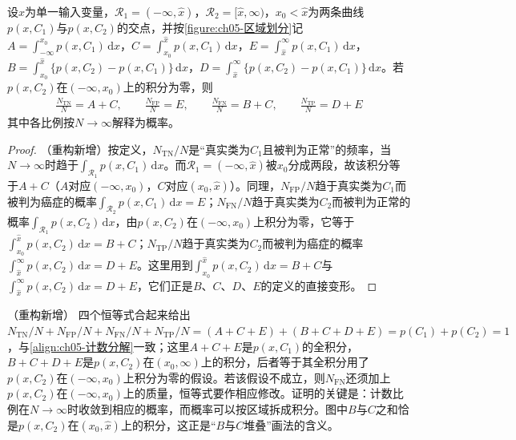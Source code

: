 \documentclass[../../main.tex]{subfiles}
\begin{document}
\begin{proposition}[区域面积与计数比例的关系]\label{proposition:ch05-面积恒等式}
设$x$为单一输入变量，$\mathcal{R}_1=(-\infty,\hat{x})$，$\mathcal{R}_2=[\hat{x},\infty)$，$x_0<\hat{x}$为两条曲线$p(x,C_1)$与$p(x,C_2)$的交点，并按\cref{figure:ch05-区域划分}记$A=\int_{-\infty}^{x_0}p(x,C_1)\,\mathrm{d}x$，$C=\int_{x_0}^{\hat{x}}p(x,C_1)\,\mathrm{d}x$，$E=\int_{\hat{x}}^{\infty}p(x,C_1)\,\mathrm{d}x$，$B=\int_{x_0}^{\hat{x}}\{p(x,C_2)-p(x,C_1)\}\,\mathrm{d}x$，$D=\int_{\hat{x}}^{\infty}\{p(x,C_2)-p(x,C_1)\}\,\mathrm{d}x$。若$p(x,C_2)$在$(-\infty,x_0)$上的积分为零，则
\begin{align}
  \frac{N_{\mathrm{TN}}}{N}=A+C,\qquad
  \frac{N_{\mathrm{FP}}}{N}=E,\qquad
  \frac{N_{\mathrm{FN}}}{N}=B+C,\qquad
  \frac{N_{\mathrm{TP}}}{N}=D+E
\end{align}
其中各比例按$N\to\infty$解释为概率。
\end{proposition}

\begin{proof}
（重构新增）按定义，$N_{\mathrm{TN}}/N$是“真实类为$C_1$且被判为正常”的频率，当$N\to\infty$时趋于$\int_{\mathcal{R}_1}p(x,C_1)\,\mathrm{d}x$。而$\mathcal{R}_1=(-\infty,\hat{x})$被$x_0$分成两段，故该积分等于$A+C$（$A$对应$(-\infty,x_0)$，$C$对应$(x_0,\hat{x})$）。同理，$N_{\mathrm{FP}}/N$趋于真实类为$C_1$而被判为癌症的概率$\int_{\mathcal{R}_2}p(x,C_1)\,\mathrm{d}x=E$；$N_{\mathrm{FN}}/N$趋于真实类为$C_2$而被判为正常的概率$\int_{\mathcal{R}_1}p(x,C_2)\,\mathrm{d}x$，由$p(x,C_2)$在$(-\infty,x_0)$上积分为零，它等于$\int_{x_0}^{\hat{x}}p(x,C_2)\,\mathrm{d}x=B+C$；$N_{\mathrm{TP}}/N$趋于真实类为$C_2$而被判为癌症的概率$\int_{\hat{x}}^{\infty}p(x,C_2)\,\mathrm{d}x=D+E$。这里用到$\int_{x_0}^{\hat{x}}p(x,C_2)\,\mathrm{d}x=B+C$与$\int_{\hat{x}}^{\infty}p(x,C_2)\,\mathrm{d}x=D+E$，它们正是$B$、$C$、$D$、$E$的定义的直接变形。
\end{proof}

\begin{remark}（重构新增）
四个恒等式合起来给出$N_{\mathrm{TN}}/N+N_{\mathrm{FP}}/N+N_{\mathrm{FN}}/N+N_{\mathrm{TP}}/N=(A+C+E)+(B+C+D+E)=p(C_1)+p(C_2)=1$，与\eqref{align:ch05-计数分解}一致；这里$A+C+E$是$p(x,C_1)$的全积分，$B+C+D+E$是$p(x,C_2)$在$(x_0,\infty)$上的积分，后者等于其全积分用了$p(x,C_2)$在$(-\infty,x_0)$上积分为零的假设。若该假设不成立，则$N_{\mathrm{FN}}$还须加上$p(x,C_2)$在$(-\infty,x_0)$上的质量，恒等式要作相应修改。证明的关键是：计数比例在$N\to\infty$时收敛到相应的概率，而概率可以按区域拆成积分。图中$B$与$C$之和恰是$p(x,C_2)$在$(x_0,\hat{x})$上的积分，这正是“$B$与$C$堆叠”画法的含义。
\end{remark}
\end{document}
